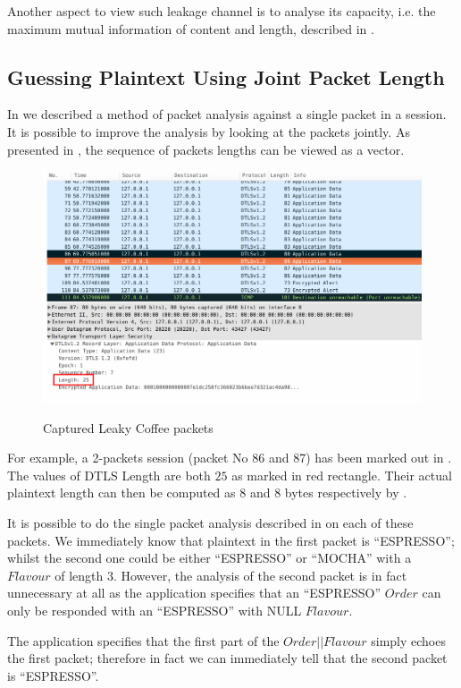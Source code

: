 Another aspect to view such leakage channel is to analyse its capacity, i.e. the maximum mutual information of content and length, described in \cite{Web2}.

\subsection{Guessing Plaintext Using Joint Packet Length}
 In  we described a method of packet analysis against a single packet in a session. It is possible to improve the analysis by looking at the packets jointly. As presented in \cite{Web2}, the sequence of packets lengths can be viewed as a vector.

\begin{example}
\begin{figure}[H] 
\centering
\resizebox{14cm}{!}
{\includegraphics{./Pics/Wireshark01.png}}
\caption{Captured Leaky Coffee packets}
\label{Fig: Captured Packets 01}
\end{figure}

For example, a 2-packets session (packet No 86 and 87) has been marked out in . The values of DTLS Length  are both $25$ as marked in red rectangle. Their actual plaintext length can then be computed as $8$ and $8$ bytes respectively by . 

It is possible to do the single packet analysis described in  on each of these packets. We immediately know that plaintext in the first packet is “ESPRESSO”; whilst the second one could be either “ESPRESSO” or “MOCHA” with a $Flavour$ of length $3$. However, the analysis of the second packet is in fact unnecessary at all as the application specifies that an “ESPRESSO” $Order$ can only be responded with an “ESPRESSO” with NULL $Flavour$.

The application specifies that the first part of the $Order||Flavour$ simply echoes the first packet; therefore in fact we can immediately tell that the second packet is “ESPRESSO”.
\end{example}

